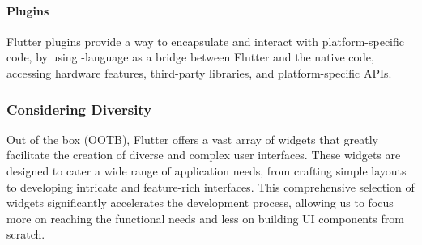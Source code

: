 \paragraph{Plugins} Flutter plugins provide a way to encapsulate and interact with platform-specific code, by using 
-language as a bridge between Flutter and the native code, accessing hardware features, third-party libraries, 
and platform-specific APIs.

\subsubsection{Considering Diversity}

Out of the box (OOTB), Flutter offers a vast array of widgets that greatly facilitate the creation of diverse and 
complex user interfaces. These widgets are designed to cater a wide range of application needs, from crafting simple 
layouts to developing intricate and feature-rich interfaces. This comprehensive selection of widgets significantly 
accelerates the development process, allowing us to focus more on reaching the functional needs and less on building UI 
components from scratch.

